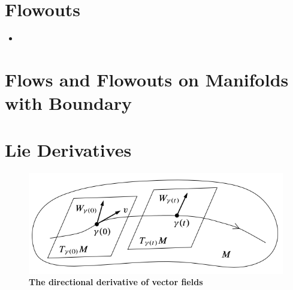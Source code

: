 \documentclass[11pt]{article}
\begin{document}
\section{Flowouts}
\begin{itemize}
\item 
\end{itemize}

\section{Flows and Flowouts on Manifolds with Boundary}


\section{Lie Derivatives}
\begin{figure}
\begin{minipage}[hb]{1\linewidth}
  \centering
  \centerline{\includegraphics[scale = 0.42]{directional_derivative_of_vector_fields.png}}
\end{minipage}
\caption{\footnotesize{\textbf{The directional derivative of vector fields  \citep{lee2003introduction}}}}
\label{fig: directional_derivative_of_vector_fields}
\end{figure}
\end{document}
